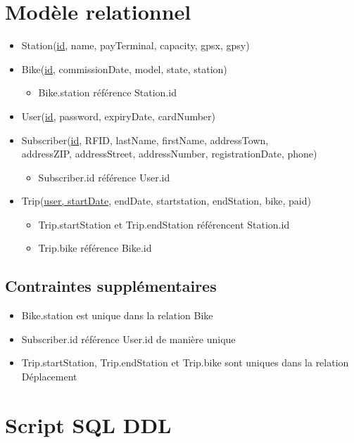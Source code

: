 \documentclass[a4paper]{article}
\begin{document}
\section{Modèle relationnel}
\begin{itemize}
\item Station(\underline{id}, name, payTerminal, capacity, gpsx, gpsy)
\item Bike(\underline{id}, commissionDate, model, state, station)
    \begin{itemize}
    \item Bike.station référence Station.id
    \end{itemize}
\item User(\underline{id}, password, expiryDate, cardNumber)
\item Subscriber(\underline{id}, RFID, lastName, firstName, addressTown,\\ addressZIP, addressStreet, addressNumber, registrationDate, phone)
    \begin{itemize}
    \item Subscriber.id référence User.id
    \end{itemize}
\item Trip(\underline{user, startDate}, endDate, startstation, endStation, bike, paid) 
    \begin{itemize}
    \item Trip.startStation et Trip.endStation référencent Station.id
    \item Trip.bike référence Bike.id
    \end{itemize}
\end{itemize}

\subsection{Contraintes supplémentaires}
\begin{itemize}
\item Bike.station est unique dans la relation Bike
\item Subscriber.id référence User.id de manière unique
\item Trip.startStation, Trip.endStation et Trip.bike sont uniques dans la relation Déplacement
\end{itemize}


\section{Script SQL DDL}
\end{document}
